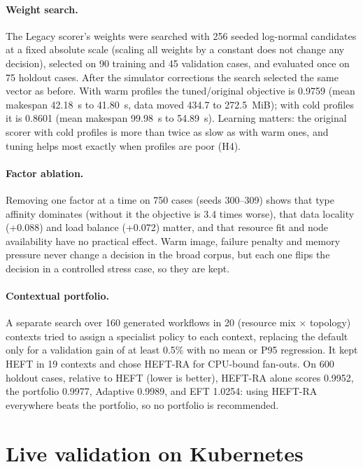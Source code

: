 \documentclass[12pt,a4paper]{report}
\begin{document}
\paragraph{Weight search.} The Legacy scorer's weights were searched with
256 seeded log-normal candidates at a fixed absolute scale (scaling all
weights by a constant does not change any decision), selected on 90
training and 45 validation cases, and evaluated once on 75 holdout cases.
After the simulator corrections the search selected the same vector as
before. With warm profiles the tuned/original objective is 0.9759 (mean
makespan 42.18~s to 41.80~s, data moved 434.7 to 272.5~MiB); with cold
profiles it is 0.8601 (mean makespan 99.98~s to 54.89~s). Learning
matters: the original scorer with cold profiles is more than twice as slow
as with warm ones, and tuning helps most exactly when profiles are poor
(H4).

\paragraph{Factor ablation.} Removing one factor at a time on 750 cases
(seeds 300--309) shows that type affinity dominates (without it the
objective is 3.4 times worse), that data locality (+0.088) and load
balance (+0.072) matter, and that resource fit and node availability have
no practical effect. Warm image, failure penalty and memory pressure never
change a decision in the broad corpus, but each one flips the decision in
a controlled stress case, so they are kept.

\paragraph{Contextual portfolio.} A separate search over 160 generated
workflows in 20 (resource mix $\times$ topology) contexts tried to assign a
specialist policy to each context, replacing the default only for a
validation gain of at least 0.5\% with no mean or P95 regression. It kept
HEFT in 19 contexts and chose HEFT-RA for CPU-bound fan-outs. On 600
holdout cases, relative to HEFT (lower is better), HEFT-RA alone scores
0.9952, the portfolio 0.9977, Adaptive 0.9989, and EFT 1.0254: using
HEFT-RA everywhere beats the portfolio, so no portfolio is recommended.

\section{Live validation on Kubernetes}
\label{sec:live}
\end{document}
